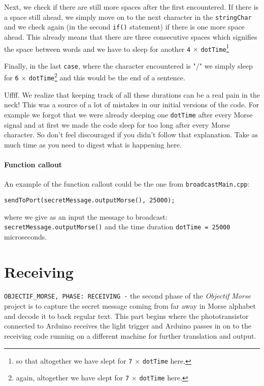 \documentclass[12pt]{report}
\begin{document}
Next, we check if there are still more spaces after the first encountered. If there is a space still ahead, we simply move on to the next character in the \texttt{stringChar} and we check again (in the second \texttt{if()} statement) if there is one more space ahead. This already means that there are three consecutive spaces which signifies the space between words and we have to sleep for another \verb|4| $\times$ \verb|dotTime|\footnote{so that altogether we have slept for \texttt{7} $\times$ \texttt{dotTime} here.}

Finally, in the last \texttt{case}, where the character encountered is "/" we simply sleep for \verb|6| $\times$ \verb|dotTime|\footnote{again, altogether we have slept for \texttt{7} $\times$ \texttt{dotTime} here.} and this would be the end of a sentence.

Uffff. We realize that keeping track of all these durations can be a real pain in the neck! This was a source of a lot of mistakes in our initial versions of the code. For example we forgot that we were already sleeping one \verb|dotTime| after every Morse signal and at first we made the code sleep for too long after every Morse character. So don't feel discouraged if you didn't follow that explanation. Take as much time as you need to digest what is happening here.

\subsubsection{Function callout}

An example of the function callout could be the one from \texttt{broadcastMain.cpp}:

\begin{lstlisting}
sendToPort(secretMessage.outputMorse(), 25000);
\end{lstlisting}

where we give as an input the message to broadcast: \texttt{secretMessage.outputMorse()} and the time duration \texttt{dotTime = 25000} microseconds.

\newpage

\chapter{Receiving}


\verb|OBJECTIF_MORSE, PHASE: RECEIVING -| the second phase of the \textit{Objectif Morse} project is to capture the secret message coming from far away in Morse alphabet and decode it to back regular text. This part begins where the phototransistor connected to Arduino receives the light trigger and Arduino passes in on to the receiving code running on a different machine for further translation and output.
\end{document}
